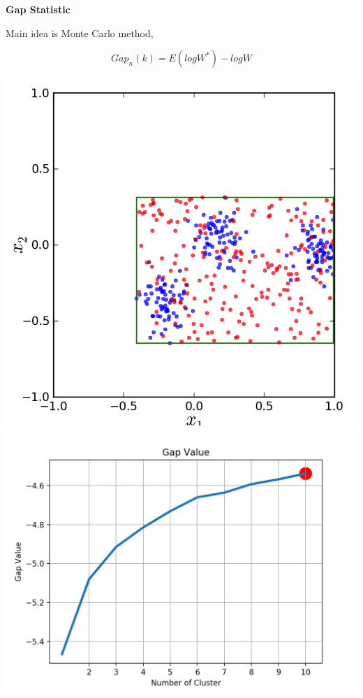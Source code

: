 \documentclass[12pt]{beamer}
\begin{document}
\begin{frame}{\textbf{Gap Statistic}}

Main idea is Monte Carlo method,

\[Gap_n(k)=E(logW^*)-logW\]


\includegraphics[scale=0.25]{fig2/gap1.png}
\includegraphics[scale=0.25]{fig2/gap2.png}

\end{frame}
\end{document}
